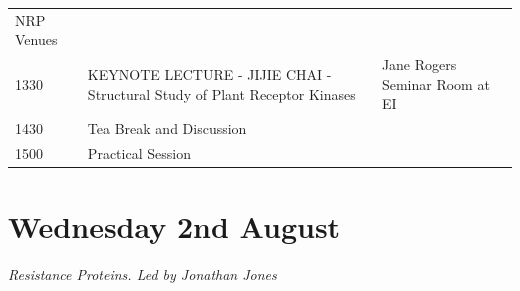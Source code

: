 \documentclass[12pt,]{book}
\begin{document}
\begin{longtable}[]{@{}lll@{}}
\begin{minipage}[t]{0.39\columnwidth}
NRP Venues\strut
\end{minipage}\tabularnewline
\begin{minipage}[t]{0.09\columnwidth}\raggedright\strut
1330\strut
\end{minipage} & \begin{minipage}[t]{0.39\columnwidth}\raggedright\strut
KEYNOTE LECTURE - JIJIE CHAI - Structural Study of Plant Receptor
Kinases\strut
\end{minipage} & \begin{minipage}[t]{0.39\columnwidth}\raggedright\strut
Jane Rogers Seminar Room at EI\strut
\end{minipage}\tabularnewline
\begin{minipage}[t]{0.09\columnwidth}\raggedright\strut
1430\strut
\end{minipage} & \begin{minipage}[t]{0.39\columnwidth}\raggedright\strut
Tea Break and Discussion\strut
\end{minipage} & \begin{minipage}[t]{0.39\columnwidth}\raggedright\strut
\strut
\end{minipage}\tabularnewline
\begin{minipage}[t]{0.09\columnwidth}\raggedright\strut
1500\strut
\end{minipage} & \begin{minipage}[t]{0.39\columnwidth}\raggedright\strut
Practical Session\strut
\end{minipage} & \begin{minipage}[t]{0.39\columnwidth}\raggedright\strut
\strut
\end{minipage}\tabularnewline
\bottomrule
\end{longtable}

\section*{Wednesday 2nd August}\label{wednesday-2nd-august}

\emph{Resistance Proteins. Led by Jonathan Jones}
\end{document}
